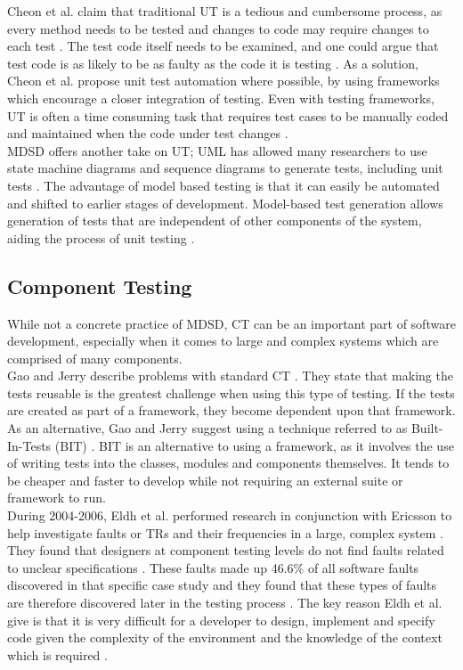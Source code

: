 \documentclass[fina_report_innit.tex]{subfiles}
\begin{document}
Cheon et al. claim that traditional UT is a tedious and cumbersome process, as every method needs to be tested and changes to code may require changes to each test \cite{cheon2002simple}. The test code itself needs to be examined, and one could argue that test code is as likely to be as faulty as the code it is testing \cite{cheon2002simple}. As a solution, Cheon et al. propose unit test automation where possible, by using frameworks which encourage a closer integration of testing. Even with testing frameworks, UT is often a time consuming task that requires test cases to be manually coded and maintained when the code under test changes \cite{cheon2002simple}.
\\

MDSD offers another take on UT; UML has allowed many researchers to use state machine diagrams and sequence diagrams to generate tests, including unit tests \cite{mussa2009survey}. The advantage of model based testing is that it can easily be automated and shifted to earlier stages of development. Model-based test generation allows generation of tests that are independent of other components of the system, aiding the process of unit testing \cite{javed2007automated}.

\subsection{Component Testing}
While not a concrete practice of MDSD, CT can be an important part of software development, especially when it comes to large and complex systems which are comprised of many components.
\\

Gao and Jerry describe problems with standard CT \cite{gao2000component}. They state that making the tests reusable is the greatest challenge when using this type of testing. If the tests are created as part of a framework, they become dependent upon that framework. As an alternative, Gao and Jerry suggest using a technique referred to as Built-In-Tests (BIT) \cite{gao2000component}. BIT is an alternative to using a framework, as it involves the use of writing tests into the classes, modules and components themselves. It tends to be cheaper and faster to develop while not requiring an external suite or framework to run.
\\

During 2004-2006, Eldh et al. performed research in conjunction with Ericsson to help investigate faults or TRs and their frequencies in a large, complex system \cite{eldh2007component}. They found that designers at component testing levels do not find faults related to unclear specifications \cite{eldh2007component}. These faults made up 46.6\% of all software faults discovered in that specific case study and they found that these types of faults are therefore discovered later in the testing process \cite{eldh2007component}. The key reason Eldh et al. give is that it is very difficult for a developer to design, implement and specify code given the complexity of the environment and the knowledge of the context which is required \cite{eldh2007component}. 
\\
\end{document}
